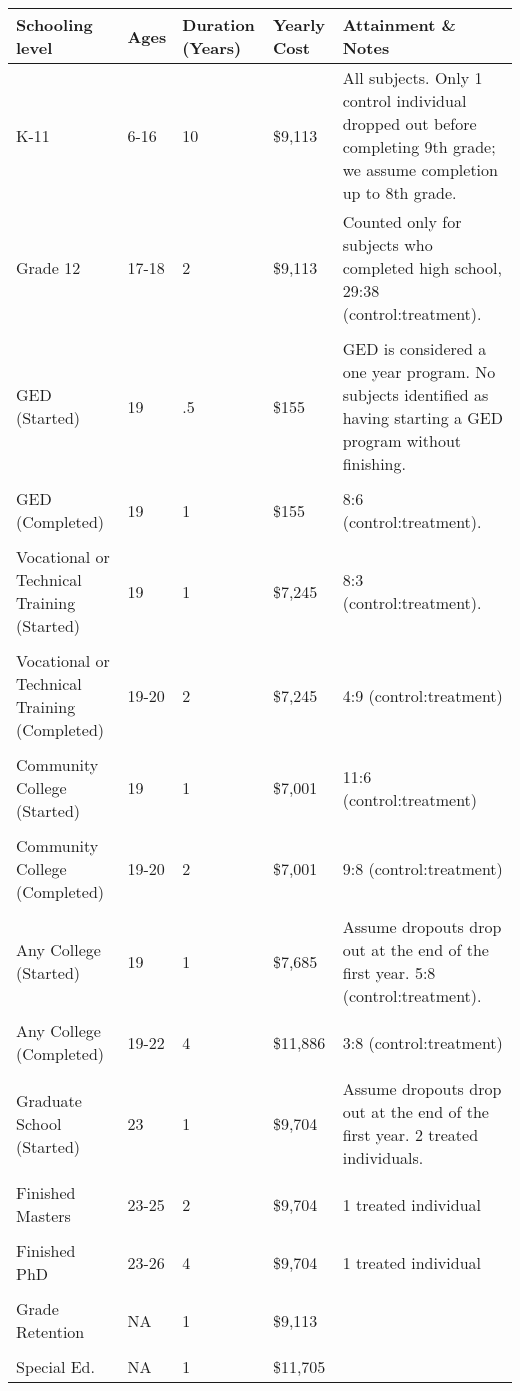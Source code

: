 \begin{tabular}{C{3.5cm} C{1.5cm} C{1.5cm} C{2cm} C{6.5cm}}
\toprule
Schooling level & Ages & Duration (Years) & Yearly Cost &Attainment \& Notes\\ \midrule
K-11 & 6-16 & 10 &   \$9,113  & All subjects. Only 1 control individual dropped out before completing 9th grade; we assume completion up to 8th grade. \\
Grade 12 & 17-18 & 2 &  \$9,113  & Counted only for subjects who completed high school, 29:38 (control:treatment).\\ \\
GED (Started) & 19 & .5 &  \$155& GED is considered a one year program. No subjects identified as having starting a GED program without finishing.\\ \\
GED (Completed) & 19 & 1 & \$155 & 8:6 (control:treatment).\\ \\
Vocational or Technical Training (Started)& 19 & 1 & \$7,245 & 8:3  (control:treatment).\\ \\
Vocational or Technical Training (Completed)& 19-20 & 2 &  \$7,245 &  4:9 (control:treatment)\\ \\
Community College (Started) &   19 & 1 &  \$7,001 & 11:6 (control:treatment) \\ \\
Community College (Completed) & 19-20 & 2 &  \$7,001 & 9:8 (control:treatment)\\ \\
 Any College (Started)   &  19 & 1 &  \$7,685& Assume dropouts drop out at the end of the first year. 5:8 (control:treatment).\\ \\
 Any College (Completed) &  19-22 & 4 & \$11,886 & 3:8 (control:treatment)\\ \\
Graduate School (Started) & 23 & 1 &  \$9,704& Assume dropouts drop out at the end of the first year. 2 treated individuals.\\ \\
 Finished Masters &  23-25 & 2 &  \$9,704& 1 treated individual\\ \\
 Finished PhD & 23-26 & 4 & \$9,704 & 1 treated individual\\ \\
 \midrule
 Grade Retention& NA & 1 &\$9,113 & \\ \\
 Special Ed.& NA & 1 &  \$11,705  & \\ 
 \bottomrule
 \end{tabular}
